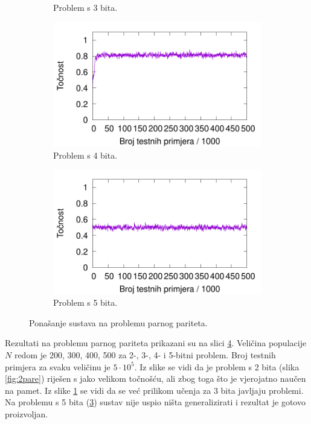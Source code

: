 \documentclass[times, utf8, zavrsni]{fer}
\begin{document}
\begin{figure}[!h]
\begin{subfigure}{0.496\textwidth}
        \caption{Problem s 3 bita.}
        \label{fig:3pare}
    \end{subfigure}
    \begin{subfigure}{0.496\textwidth}
        \centering
        \includegraphics[width=\textwidth]{img/parity/4pare.pdf}
        \caption{Problem s 4 bita.}
        \label{fig:4pare}
    \end{subfigure}
    \begin{subfigure}{0.496\textwidth}
        \centering
        \includegraphics[width=\textwidth]{img/parity/5pare.pdf}
        \caption{Problem s 5 bita.}
        \label{fig:5pare}
    \end{subfigure}
    \caption{Ponašanje sustava na problemu parnog pariteta.}
    \label{fig:pare}
\end{figure}
Rezultati na problemu parnog pariteta prikazani su na slici \ref{fig:pare}.
Veličina populacije $N$ redom je 200, 300, 400, 500 za 2-, 3-, 4- i 5-bitni problem.
Broj testnih primjera za svaku veličinu je $5 \cdot 10^{5}$.
Iz slike se vidi da je problem s 2 bita (slika \ref{fig:2pare}) riješen s jako velikom točnošću, ali zbog toga što je vjerojatno naučen na pamet.
Iz slike \ref{fig:3pare} se vidi da se već prilikom učenja za 3 bita javljaju problemi.
Na problemu s 5 bita (\ref{fig:5pare}) sustav nije uspio ništa generalizirati i rezultat je gotovo proizvoljan.
\end{document}
